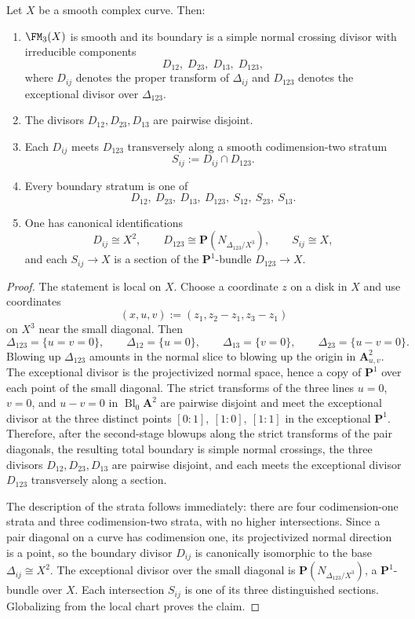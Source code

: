 \begin{proposition}
\label{prop:fm3-boundary-geometry}
Let $X$ be a smooth complex curve.  Then:
\begin{enumerate}[label=\textup{(\alph*)}]
\item $\FM_3(X)$ is smooth and its boundary is a simple normal crossing divisor
  with irreducible components
  \[
  D_{12},\; D_{23},\; D_{13},\; D_{123},
  \]
  where $D_{ij}$ denotes the proper transform of $\Delta_{ij}$ and
  $D_{123}$ denotes the exceptional divisor over $\Delta_{123}$.
\item The divisors $D_{12},D_{23},D_{13}$ are pairwise disjoint.
\item Each $D_{ij}$ meets $D_{123}$ transversely along a smooth codimension-two
  stratum
  \[
  S_{ij} := D_{ij}\cap D_{123}.
  \]
\item Every boundary stratum is one of
  \[
  D_{12},\ D_{23},\ D_{13},\ D_{123},\ S_{12},\ S_{23},\ S_{13}.
  \]
\item One has canonical identifications
  \[
  D_{ij} \cong X^2,
  \qquad
  D_{123} \cong \mathbf{P}(N_{\Delta_{123}/X^3}),
  \qquad
  S_{ij} \cong X,
  \]
  and each $S_{ij}\to X$ is a section of the $\mathbf{P}^1$-bundle
  $D_{123}\to X$.
\end{enumerate}
\end{proposition}

\begin{proof}
The statement is local on $X$.  Choose a coordinate $z$ on a disk in $X$ and
use coordinates
\[
(x,u,v) := (z_1, z_2-z_1, z_3-z_1)
\]
on $X^3$ near the small diagonal.  Then
\[
\Delta_{123} = \{u=v=0\},
\qquad
\Delta_{12} = \{u=0\},
\qquad
\Delta_{13} = \{v=0\},
\qquad
\Delta_{23} = \{u-v=0\}.
\]
Blowing up $\Delta_{123}$ amounts in the normal slice to blowing up the origin
in $\mathbf{A}^2_{u,v}$.  The exceptional divisor is the projectivized normal
space, hence a copy of $\mathbf{P}^1$ over each point of the small diagonal.
The strict transforms of the three lines $u=0$, $v=0$, and $u-v=0$ in
$\operatorname{Bl}_0 \mathbf{A}^2$ are pairwise disjoint and meet the
exceptional divisor at the three distinct points
$[0:1],\ [1:0],\ [1:1]$
in the exceptional $\mathbf{P}^1$.  Therefore, after the second-stage blowups
along the strict transforms of the pair diagonals, the resulting total boundary
is simple normal crossings, the three divisors $D_{12},D_{23},D_{13}$ are
pairwise disjoint, and each meets the exceptional divisor $D_{123}$
transversely along a section.

The description of the strata follows immediately: there are four codimension-one
strata and three codimension-two strata, with no higher intersections.  Since a
pair diagonal on a curve has codimension one, its projectivized normal direction
is a point, so the boundary divisor $D_{ij}$ is canonically isomorphic to the
base $\Delta_{ij} \cong X^2$.  The exceptional divisor over the small diagonal is
$\mathbf{P}(N_{\Delta_{123}/X^3})$, a $\mathbf{P}^1$-bundle over $X$.  Each
intersection $S_{ij}$ is one of its three distinguished sections.  Globalizing
from the local chart proves the claim.
\end{proof}

